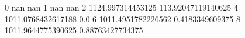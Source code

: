 0 nan nan
1 nan nan
2 1124.997314453125 113.92047119140625
4 1011.0768432617188 0.0
6 1011.4951782226562 0.4183349609375
8 1011.9644775390625 0.88763427734375
